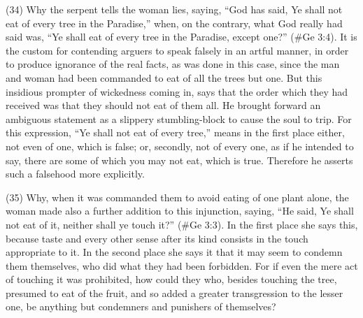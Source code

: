 (34) Why the serpent tells the woman lies, saying, ``God has said, Ye shall not eat of every tree in
the Paradise,'' when, on the contrary, what God really had said was, ``Ye shall eat of every tree in
the Paradise, except one?'' (\#Ge 3:4). It is the custom for contending arguers to speak falsely
in an artful manner, in order to produce ignorance of the real facts, as was done in this case, since
the man and woman had been commanded to eat of all the trees but one. But this insidious
prompter of wickedness coming in, says that the order which they had received was that they
should not eat of them all. He brought forward an ambiguous statement as a slippery
stumbling-block to cause the soul to trip. For this expression, ``Ye shall not eat of every tree,''
means in the first place either, not even of one, which is false; or, secondly, not of every one, as if
he intended to say, there are some of which you may not eat, which is true. Therefore he asserts
such a falsehood more explicitly.

(35) Why, when it was commanded them to avoid eating of one plant alone, the woman made also
a further addition to this injunction, saying, ``He said, Ye shall not eat of it, neither shall ye touch it?''
(\#Ge 3:3). In the first place she says this, because taste and every other sense after its kind
consists in the touch appropriate to it. In the second place she says it that it may seem to condemn
them themselves, who did what they had been forbidden. For if even the mere act of touching it
was prohibited, how could they who, besides touching the tree, presumed to eat of the fruit, and so
added a greater transgression to the lesser one, be anything but condemners and punishers of
themselves?

